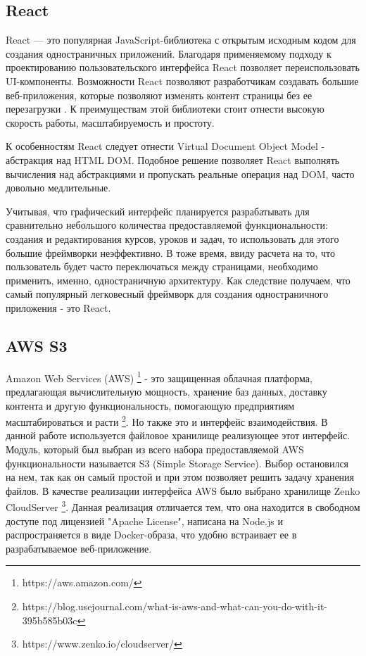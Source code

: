 \documentclass[%
  a5paper,
  subf,
  href,
  master,
  dotsinheaders 
]{csse-fcs}
\begin{document}
\subsection{React}

React — это популярная JavaScript-библиотека с открытым исходным кодом для создания одностраничных приложений. Благодаря применяемому подходу к проектированию пользовательского интерфейса React позволяет переиспользовать UI-компоненты. Возможности React позволяют разработчикам создавать большие веб-приложения, которые позволяют изменять контент страницы без ее перезагрузки \cite{react}. К преимуществам этой библиотеки стоит отнести высокую скорость работы, масштабируемость и простоту.

К особенностям React следует отнести Virtual Document Object Model - абстракция над HTML DOM. Подобное решение позволяет React выполнять вычисления над абстракциями и пропускать реальные операция над DOM, часто довольно медлительные.


Учитывая, что графический интерфейс планируется разрабатывать для сравнительно небольшого количества предоставляемой функциональности: создания и редактирования курсов, уроков и задач, то использовать для этого большие фреймворки неэффективно. В тоже время, ввиду расчета на то, что пользователь будет часто переключаться между страницами, необходимо применить, именно, одностраничную архитектуру. Как следствие получаем, что самый популярный легковесный фреймворк для создания одностраничного приложения - это React.

\subsection{AWS S3}

Amazon Web Services (AWS) \footnote{https://aws.amazon.com/} - это защищенная облачная платформа, предлагающая вычислительную мощность, хранение баз данных, доставку контента и другую функциональность, помогающую предприятиям масштабироваться и расти \footnote{https://blog.usejournal.com/what-is-aws-and-what-can-you-do-with-it-395b585b03c}.
Но также это и интерфейс взаимодействия.
В данной работе используется файловое хранилище реализующее этот интерфейс. Модуль, который был выбран из всего набора предоставляемой AWS функциональности называется S3 (Simple Storage Service). 
Выбор остановился на нем, так как он самый простой и при этом позволяет решить задачу хранения файлов. В качестве реализации интерфейса AWS  было выбрано хранилище Zenko CloudServer \footnote{https://www.zenko.io/cloudserver/}.
Данная реализация отличается тем, что она находится в свободном доступе под лицензией "Apache License"{}, написана на Node.js и распространяется в виде Docker-образа, что удобно встраивает ее в разрабатываемое веб-приложение.
\end{document}
